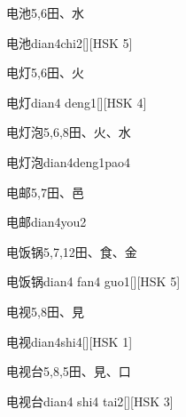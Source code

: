 \begin{entry}{电池}{5,6}{⽥、⽔}
  \begin{phonetics}{电池}{dian4chi2}[][HSK 5]
  \end{phonetics}
\end{entry}

\begin{entry}{电灯}{5,6}{⽥、⽕}
  \begin{phonetics}{电灯}{dian4 deng1}[][HSK 4]
  \end{phonetics}
\end{entry}

\begin{entry}{电灯泡}{5,6,8}{⽥、⽕、⽔}
  \begin{phonetics}{电灯泡}{dian4deng1pao4}
  \end{phonetics}
\end{entry}

\begin{entry}{电邮}{5,7}{⽥、⾢}
  \begin{phonetics}{电邮}{dian4you2}
  \end{phonetics}
\end{entry}

\begin{entry}{电饭锅}{5,7,12}{⽥、⾷、⾦}
  \begin{phonetics}{电饭锅}{dian4 fan4 guo1}[][HSK 5]
  \end{phonetics}
\end{entry}

\begin{entry}{电视}{5,8}{⽥、⾒}
  \begin{phonetics}{电视}{dian4shi4}[][HSK 1]
  \end{phonetics}
\end{entry}

\begin{entry}{电视台}{5,8,5}{⽥、⾒、⼝}
  \begin{phonetics}{电视台}{dian4 shi4 tai2}[][HSK 3]
  \end{phonetics}
\end{entry}

